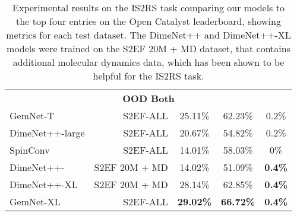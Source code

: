 \documentclass{article} \usepackage{iclr2022_conference,times}
\newcommand{\mc}[3]{\multicolumn{#1}{#2}{#3}}
\begin{document}
\begin{table*}[t]
\begin{tabular}{lrccc}
        \midrule
        \mc{5}{c}{\textbf{OOD Both}} \\
        GemNet-T & S2EF-ALL & 25.11\% &	62.23\%	& 0.2\% \\
        DimeNet++-large & S2EF-ALL & 20.67\% & 54.82\% & 0.2\% \\
        SpinConv & S2EF-ALL & 14.01\% &	58.03\% & 0\%	\\
        DimeNet++- & S2EF 20M + MD & 14.02\% & 51.09\% & \textbf{0.4\%} \\
        DimeNet++-XL & S2EF 20M + MD & 28.14\% & 62.85\% & \textbf{0.4\%} \\
        GemNet-XL & S2EF-ALL & \textbf{29.02\%} & \textbf{66.72\%} & \textbf{0.4\%} \\

        \bottomrule
    \end{tabular}
\caption{Experimental results on the IS2RS task comparing our models to the top four entries on the Open Catalyst leaderboard, showing metrics for each test dataset. The DimeNet++ and DimeNet++-XL models were trained on the S2EF 20M + MD dataset, that contains additional molecular dynamics data, which has been shown to be helpful for the IS2RS task.}
    \label{tab:is2rs_results_full}
\end{table*}
\end{document}
